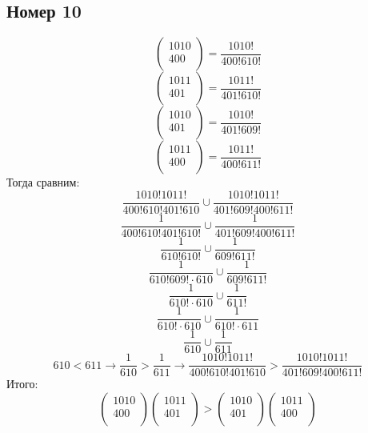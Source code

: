 \documentclass[a4paper,12pt]{article}
\begin{document}
\subsection*{Номер 10}
\[
\begin{pmatrix}
1010 \\ 400 \\
\end{pmatrix} = \frac{1010!}{400!610!}
\]
\[
\begin{pmatrix}
1011 \\ 401 \\
\end{pmatrix} = \frac{1011!}{401!610!}
\]
\[
\begin{pmatrix}
1010 \\ 401 \\
\end{pmatrix} = \frac{1010!}{401!609!}
\]
\[
\begin{pmatrix}
1011 \\ 400 \\
\end{pmatrix} = \frac{1011!}{400!611!}
\]
Тогда сравним:
\[
\frac{1010! 1011!}{400!610!401!610}  \cup \frac{1010!1011!}{401!609!400!611!}
\]
\[
\frac{1}{400!610!401!610!}  \cup \frac{1}{401!609!400!611!}
\]
\[
\frac{1}{610!610!}  \cup \frac{1}{609!611!}
\]
\[
\frac{1}{610!609! \cdot 610}  \cup \frac{1}{609!611!}
\]
\[
\frac{1}{610!\cdot 610}  \cup \frac{1}{611!}
\]
\[
\frac{1}{610!\cdot 610}  \cup \frac{1}{610! \cdot 611}
\]
\[
\frac{1}{610}  \cup \frac{1}{611}
\]
\[
610 < 611 \rightarrow \frac{1}{610}  >  \frac{1}{611} \rightarrow \frac{1010! 1011!}{400!610!401!610}  > \frac{1010!1011!}{401!609!400!611!}
\]
Итого:
\[
\begin{pmatrix}
1010 \\ 400 \\
\end{pmatrix}
\begin{pmatrix}
1011 \\ 401 \\
\end{pmatrix} > 
\begin{pmatrix}
1010 \\ 401 \\
\end{pmatrix}
\begin{pmatrix}
1011 \\ 400 \\
\end{pmatrix} 
\]
\end{document}
